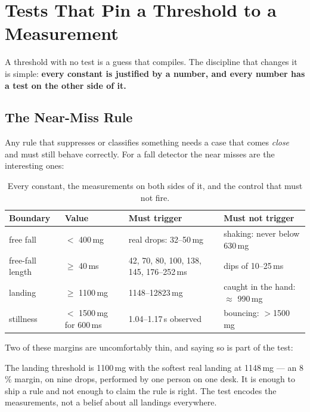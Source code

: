 \section{Tests That Pin a Threshold to a Measurement}
\label{sec:tests-pin-thresholds}

A threshold with no test is a guess that compiles. The discipline that changes it is simple:
\textbf{every constant is justified by a number, and every number has a test on the other side
of it.}

\subsection{The Near-Miss Rule}

Any rule that suppresses or classifies something needs a case that comes \emph{close} and
must still behave correctly. For a fall detector the near misses are the interesting ones:

\begin{table}[H]
\centering
\begin{tabular}{llll}
\hline
\textbf{Boundary} & \textbf{Value} & \textbf{Must trigger} & \textbf{Must not trigger} \\
\hline
free fall & $<$ 400\,mg & real drops: 32--50\,mg & shaking: never below 630\,mg \\
free-fall length & $\geq$ 40\,ms & 42, 70, 80, 100, 138, 145, 176--252\,ms & dips of 10--25\,ms \\
landing & $\geq$ 1100\,mg & 1148--12823\,mg & caught in the hand: $\approx$ 990\,mg \\
stillness & $<$ 1500\,mg for 600\,ms & 1.04--1.17\,s observed & bouncing: $>$1500\,mg \\
\hline
\end{tabular}
\caption{Every constant, the measurements on both sides of it, and the control that must not fire.}
\label{tab:thresholds-near-miss}
\end{table}

Two of these margins are uncomfortably thin, and saying so is part of the test:

\begin{warningbox}
    The landing threshold is 1100\,mg with the softest real landing at 1148\,mg — an 8\,\%
    margin, on nine drops, performed by one person on one desk. It is enough to ship a rule
    and not enough to claim the rule is right. The test encodes the measurements, not a
    belief about all landings everywhere.
\end{warningbox}

